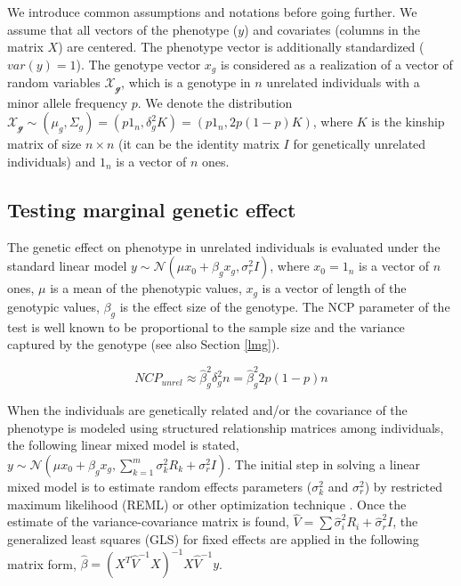 \documentclass[]{book}
\theoremstyle{definition}
\theoremstyle{definition}
\theoremstyle{definition}
\theoremstyle{remark}
\begin{document}
We introduce common assumptions and notations before going further. We
assume that all vectors of the phenotype (\(y\)) and covariates (columns
in the matrix \(X\)) are centered. The phenotype vector is additionally
standardized (\(var(y) = 1\)). The genotype vector \(x_g\) is considered
as a realization of a vector of random variables \(\mathcal{X_g}\),
which is a genotype in \(n\) unrelated individuals with a minor allele
frequency \(p\). We denote the distribution
\(\mathcal{X_g} \sim (\mu_g, \Sigma_g) = (p 1_n, \delta_g^2 K) = (p 1_n, 2 p (1-p) K)\),
where \(K\) is the kinship matrix of size \(n \times n\) (it can be the
identity matrix \(I\) for genetically unrelated individuals) and \(1_n\)
is a vector of \(n\) ones.

\subsection{Testing marginal genetic
effect}\label{testing-marginal-genetic-effect}

The genetic effect on phenotype in unrelated individuals is evaluated
under the standard linear model
\(y \sim \mathcal{N} (\mu x_0 + \beta_g x_g, \sigma_r^2 I)\), where
\(x_0 = 1_n\) is a vector of \(n\) ones, \(\mu\) is a mean of the
phenotypic values, \(x_g\) is a vector of length of the genotypic
values, \(\beta_g\) is the effect size of the genotype. The NCP
parameter of the test is well known to be proportional to the sample
size and the variance captured by the genotype (see also Section
\ref{lmg}).

\begin{equation} 
NCP_{unrel} \approx \hat{\beta}_g^2 \delta_g^2 n  = \hat{\beta}_g^2 2 p (1 - p) n
\label{eq:ncpgun}
\end{equation}

When the individuals are genetically related and/or the covariance of
the phenotype is modeled using structured relationship matrices among
individuals, the following linear mixed model is stated,
\(y \sim \mathcal{N} (\mu x_0 + \beta_g x_g, \sum_{k=1}^{m}{\sigma_k^2 R_k} + \sigma_r^2 I)\).
The initial step in solving a linear mixed model is to estimate random
effects parameters (\(\sigma_k^2\) and \(\sigma_r^2\)) by restricted
maximum likelihood (REML) or other optimization technique
\citep{Lynch1998}. Once the estimate of the variance-covariance matrix
is found, \(\hat{V} = \sum{\hat{\sigma}_i^2 R_i} + \hat{\sigma}_r^2 I\),
the generalized least squares (GLS) for fixed effects are applied in the
following matrix form,
\(\hat{\beta} = (X^T \hat{V}^{-1} X)^{-1} X \hat{V}^{-1} y\).
\end{document}
